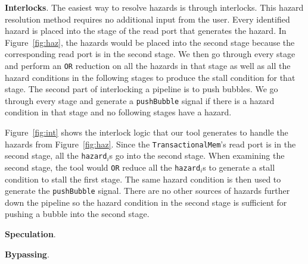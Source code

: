 {\bf Interlocks}. The easiest way to resolve
hazards is through interlocks. This hazard resolution method requires
no additional input from the user. Every identified hazard is placed
into the stage of the read port that generates the hazard. In
Figure~\ref{fig:haz}, the hazards would be placed into the second
stage because the corresponding read port is in the second stage. We
then go through every stage and perform an {\tt OR} reduction on all
the hazards in that stage as well as all the hazard conditions in the
following stages to produce the stall condition for that stage. The
second part of interlocking a pipeline is to push bubbles. We go
through every stage and generate a {\tt pushBubble} signal if there is
a hazard condition in that stage and no following stages have a
hazard.

Figure~\ref{fig:int} shows the interlock logic that our tool
generates to handle the hazards from Figure~\ref{fig:haz}. Since
the {\tt TransactionalMem}'s read port is in the second stage, all the
{\tt hazard$_i$}s go into the second stage. When examining the second
stage, the tool would {\tt OR} reduce all the {\tt hazard}$_i$s to
generate a stall condition to stall the first stage. The same hazard
condition is then used to generate the {\tt pushBubble} signal. There
are no other sources of hazards further down the pipeline so the
hazard condition in the second stage is sufficient for pushing a
bubble into the second stage.

{\bf Speculation}.

{\bf Bypassing}.
